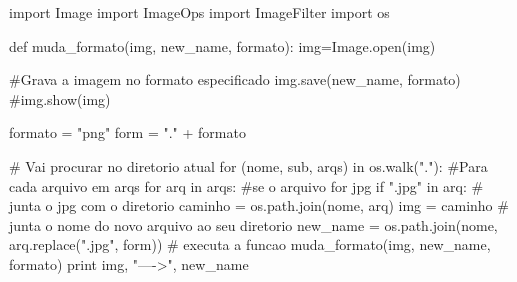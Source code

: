 import Image 	
import ImageOps
import ImageFilter
import os

def muda_formato(img, new_name, formato):
	img=Image.open(img)

	#Grava a imagem no formato especificado
	img.save(new_name, formato)
	#img.show(img)

formato = "png"
form = "." + formato

# Vai procurar no diretorio atual
for (nome, sub, arqs) in os.walk("."):
	#Para cada arquivo em arqs
	for arq in arqs:
		#se o arquivo for jpg
		if ".jpg" in arq:
			# junta o jpg com o diretorio
			caminho = os.path.join(nome, arq)
			img = caminho
			# junta o nome do novo arquivo ao seu diretorio
			new_name = os.path.join(nome,  arq.replace(".jpg", form))
			# executa a funcao
			muda_formato(img, new_name, formato)
			print img, "---->",  new_name
